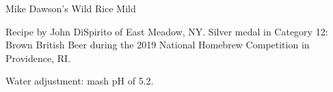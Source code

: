 \begin{recipe}{Mike Dawson's Wild Rice Mild} %

\begin{aboutblock}
Recipe by John DiSpirito of East Meadow, NY. Silver medal in Category 12:
Brown British Beer during the 2019 National Homebrew Competition
in Providence, RI. \sourceaha
\end{aboutblock}


\begin{methodandtiming}
 
\begin{mashsteps}
\end{mashsteps}

\begin{fermentationsteps}
\end{fermentationsteps}

\begin{directions}
Water adjustment: mash pH of 5.2.
\end{directions}

\end{methodandtiming}

\recipebreak

\begin{ingredientsblock}

\begin{malts}
\end{malts}

\begin{hops}
\end{hops}


\end{ingredientsblock}

\end{recipe}

